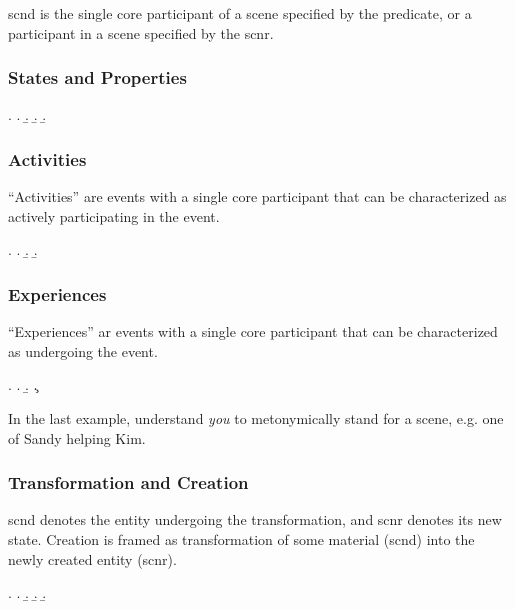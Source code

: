 \documentclass[a4paper]{article}
\begin{document}
\textsf{scnd} is the single core participant of a scene specified by the
predicate, or a participant in a scene specified by the \textsf{scnr}.

\subsubsection{States and Properties}

\ex. \a. 
     \b. 
     \b. 
     \b. 

\subsubsection{Activities}

``Activities'' are events with a single core participant that can be
characterized as actively participating in the event.

\ex. \a. 
     \b. 
     \b. 

\subsubsection{Experiences}

``Experiences'' ar events with a single core participant that can be
characterized as undergoing the event.

\ex. \a. 
     \b. 
     \c. 

In the last example, understand \emph{you} to metonymically stand for a scene,
e.g. one of Sandy helping Kim.

\subsubsection{Transformation and Creation}

\textsf{scnd} denotes the entity undergoing the transformation, and
\textsf{scnr} denotes its new state. Creation is framed as transformation of
some material (\textsf{scnd}) into the newly created entity (\textsf{scnr}).

\ex. \a. 
     \b. 
     \b. 
     \b. 
\end{document}
